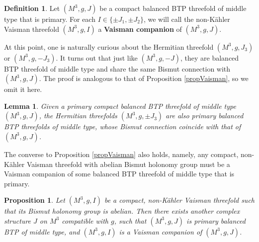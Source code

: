 \documentclass{amsart}
\numberwithin{equation}{section}
\newtheorem{proposition}[theorem]{Proposition}
\newtheorem{lemma}  [theorem]     {Lemma}
\theoremstyle{definition}
\newtheorem{definition}  [theorem]     {Definition}
\renewcommand{\1}{\mathds{1}}
\renewcommand{\>}{\rightarrow}
\begin{document}
\begin{definition}
Let $(M^3,g,J)$ be a compact balanced BTP threefold of middle type that is primary. For each $I\in \{ \pm J_1, \pm J_2\}$, we will call the non-K\"ahler Vaisman threefold $(M^3,g,I)$ a {\bf Vaisman companion} of $(M^3,g,J)$.
\end{definition}


At this point, one is naturally curious about the Hermitian threefold $(M^3,g,J_3)$ or $(M^3,g,-J_3)$. It turns out that just like $(M^3,g,-J)$, they are balanced BTP threefold of middle type and share the same Bismut connection with $(M^3,g,J)$. The proof is analogous to that of Proposition \ref{propVaisman}, so we omit it here.

\begin{lemma}
Given a primary compact balanced BTP threefold of middle type $(M^3,g,J)$, the Hermitian threefolds
 $(M^3,g,\pm J_3)$ are also primary balanced BTP threefolds of middle type, whose Bismut connection coincide with that of $(M^3,g,J)$.
\end{lemma}



The converse to Proposition \ref{propVaisman} also holds, namely, any compact, non-K\"ahler Vaisman threefold with abelian Bismut holonomy group must be a Vaisman companion of some balanced BTP threefold of middle type that is primary.

\begin{proposition} \label{propinverse}
Let $(M^3,g,I)$ be a compact, non-K\"ahler Vaisman threefold such that its Bismut holonomy group is abelian. Then there exists another complex structure $J$ on $M^3$ compatible with $g$, such that $(M^3,g,J)$ is primary balanced BTP of middle type, and $(M^3,g,I)$ is a Vaisman companion of  $(M^3,g,J)$.
\end{proposition}
\end{document}
